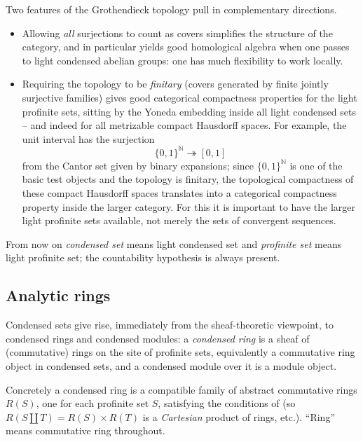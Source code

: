 \begin{remark}
\label{rmk:1:covers-and-finitary}
Two features of the Grothendieck topology pull in complementary directions.
\begin{itemize}
\item Allowing \emph{all} surjections to count as covers simplifies the structure
of the category, and in particular yields good homological algebra when one
passes to light condensed abelian groups: one has much flexibility to work
locally.
\item Requiring the topology to be \emph{finitary} (covers generated by finite
jointly surjective families) gives good categorical compactness properties for
the light profinite sets, sitting by the Yoneda embedding inside all light
condensed sets -- and indeed for all metrizable compact Hausdorff spaces. For
example, the unit interval has the surjection
\begin{equation*}
\{0,1\}^{\mathbb{N}}\twoheadrightarrow [0,1]
\end{equation*}
from the Cantor set given by binary expansions; since $\{0,1\}^{\mathbb{N}}$ is
one of the basic test objects and the topology is finitary, the topological
compactness of these compact Hausdorff spaces translates into a categorical
compactness property inside the larger category. For this it is important to have
the larger light profinite sets available, not merely the sets of convergent
sequences.
\end{itemize}
\end{remark}

\begin{notation}
\label{not:1:drop-light}
From now on \emph{condensed set} means light condensed set and \emph{profinite
set} means light profinite set; the countability hypothesis is always present.
\end{notation}

\subsection{Analytic rings}

Condensed sets give rise, immediately from the sheaf-theoretic viewpoint, to
condensed rings and condensed modules: a \emph{condensed ring} is a sheaf of
(commutative) rings on the site of profinite sets, equivalently a commutative
ring object in condensed sets, and a condensed module over it is a module object.

\begin{remark}
\label{rmk:1:condensed-ring-pointwise}
Concretely a condensed ring is a compatible family of abstract commutative rings
$R(S)$, one for each profinite set $S$, satisfying the conditions of
 (so $R(S\amalg T)=R(S)\times R(T)$ is a
\emph{Cartesian} product of rings, etc.). ``Ring'' means commutative ring
throughout.
\end{remark}

